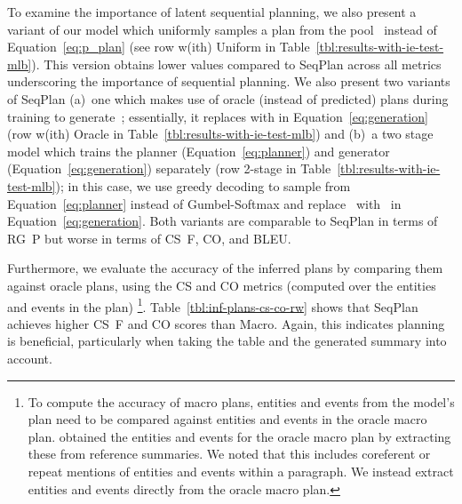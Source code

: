 To examine the importance of latent sequential planning, we also
present a variant of our model which uniformly samples a plan from the
pool~ instead of Equation~\eqref{eq:p_plan} (see row
w(ith) Uniform in Table~\ref{tbl:results-with-ie-test-mlb}). This
version obtains lower values compared to SeqPlan across all metrics
underscoring the importance of sequential planning.  We also present
two variants of SeqPlan (a)~one which makes use of oracle (instead of
predicted) plans during training to generate~; essentially, it
replaces  with  in Equation~\eqref{eq:generation} (row
w(ith) Oracle in Table~\ref{tbl:results-with-ie-test-mlb}) and (b)~a
two stage model which trains the planner (Equation~\eqref{eq:planner})
and generator (Equation~\eqref{eq:generation}) separately (row 2-stage
in Table~\ref{tbl:results-with-ie-test-mlb}); in this case, we use
greedy decoding to sample  from Equation~\eqref{eq:planner}
instead of Gumbel-Softmax and replace~ with~ in
Equation~\eqref{eq:generation}. Both variants are comparable to
SeqPlan in terms of RG~P but worse in terms of CS~F, CO, and BLEU.

Furthermore, we evaluate the accuracy of the inferred plans by
comparing them against oracle plans, using the CS and CO metrics
(computed over the entities and events in the plan) \footnote{To
  compute the accuracy of macro plans, entities and events from the
  model's plan need to be compared against entities and events in the
  oracle macro plan. \citet{Puduppully-2020} obtained the entities and
  events for the oracle macro plan by extracting these from reference
  summaries.  We noted that this includes coreferent or repeat
  mentions of entities and events within a paragraph.  We instead
  extract entities and events directly from the oracle macro plan.}.
Table~\ref{tbl:inf-plans-cs-co-rw} shows that SeqPlan achieves higher
CS~F and CO scores than Macro.  Again, this indicates planning is
beneficial, particularly when taking the table and the generated
summary into account.



